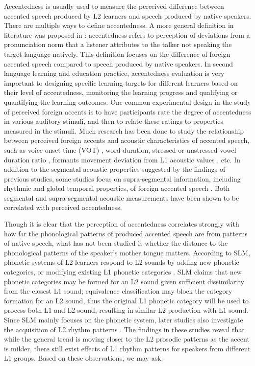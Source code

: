 Accentedness is usually used to measure the perceived difference between accented speech produced by L2 learners and speech produced by native speakers. There are multiple ways to define accentedness. A more general definition in literature was proposed in \citep{mccullough2013acoustic}: accentedness refers to perception of deviations from a pronunciation norm that a listener attributes to the talker not speaking the target language natively. This definition focuses on the difference of foreign accented speech compared to speech produced by native speakers. In second language learning and education practice, accentedness evaluation is very important to designing specific learning targets for different learners based on their level of accentedness, monitoring the learning progress and qualifying or quantifying the learning outcomes. One common experimental design in the study of perceived foreign accents is to have participants rate the degree of accentedness in various auditory stimuli, and then to relate these ratings to properties measured in the stimuli. Much research has been done to study the relationship between perceived foreign accents and acoustic characteristics of accented speech, such as voice onset time (VOT) \citep{major1987english}, word duration, stressed or unstressed vowel duration ratio \citep{shah2002temporal}, formants movement deviation from L1 acoustic values \citep{munro1993productions}, etc. In addition to the segmental acoustic properties suggested by the findings of previous studies, some studies focus on supra-segmental information, including rhythmic and global temporal properties, of foreign accented speech \citep{munro2010detection,kang2010relative}. Both segmental and supra-segmental acoustic measurements have been shown to be correlated with perceived accentedness.

Though it is clear that the perception of accentedness correlates strongly with how far the phonological patterns of produced accented speech are from patterns of native speech, what has not been studied is whether the distance to the phonological patterns of the speaker's mother tongue matters. According to SLM, phonetic systems of L2 learners respond to L2 sounds by adding new phonetic categories, or modifying existing L1 phonetic categories \citep{flege1995second}. SLM claims that new phonetic categories may be formed for an L2 sound given sufficient dissimilarity from the closest L1 sound; equivalence classification may block the category formation for an L2 sound, thus the original L1 phonetic category will be used to process both L1 and L2 sound, resulting in similar L2 production with L1 sound. Since SLM mainly focuses on the phonetic system, later studies also investigate the acquisition of L2 rhythm patterns \citep{rasier2007prosodic,ordin2015acquisition}. The findings in these studies reveal that while the general trend is moving closer to the L2 prosodic patterns as the accent is milder, there still exist effects of L1 rhythm patterns for speakers from different L1 groups. Based on these observations, we may ask:

